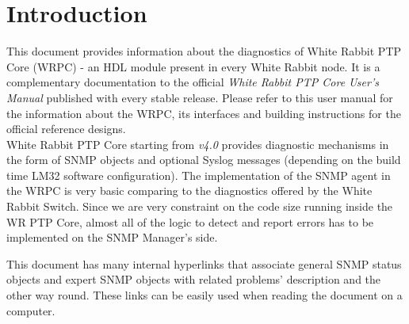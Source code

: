 \section{Introduction}

This document provides information about the diagnostics of White Rabbit
PTP Core (WRPC) - an HDL module present in every White Rabbit node. It is a
complementary documentation to the official \emph{White Rabbit PTP Core User's
Manual} published with every stable release. Please refer to this user manual
for the information about the WRPC, its interfaces and building instructions for
the official reference designs.\\

White Rabbit PTP Core starting from \emph{v4.0} provides diagnostic mechanisms
in the form of SNMP objects and optional Syslog messages (depending on the build
time LM32 software configuration). The implementation of the SNMP agent in the
WRPC is very basic comparing to the diagnostics offered by the White Rabbit
Switch. Since we are very constraint on the code size running inside the WR PTP
Core, almost all of the logic to detect and report errors has to be implemented
on the SNMP Manager's side.


This document has many internal hyperlinks that associate general SNMP status
objects and expert SNMP objects with related problems' description and the other
way round. These links can be easily used when reading the document on a
computer.
